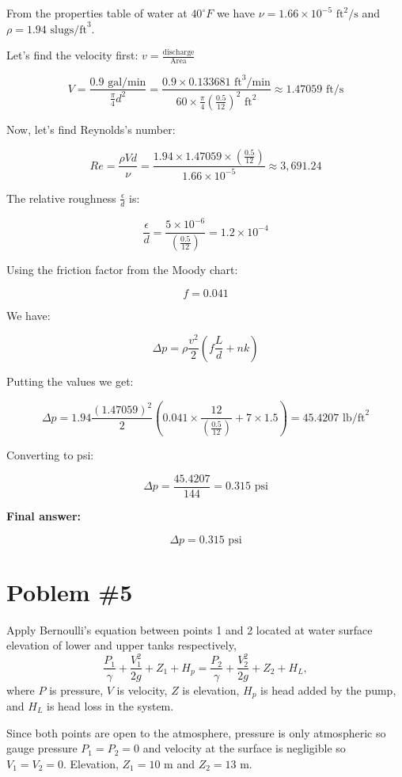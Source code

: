 \documentclass{article}
\begin{document}
From the properties table of water at $40^\circ F$ we have $\nu = 1.66 \times 10^{-5} \text{ ft}^2/\text{s}$ and $\rho = 1.94 \text{ slugs/ft}^3$.

Let's find the velocity first: $v = \frac{\text{discharge}}{\text{Area}}$

\[ V = \frac{0.9 \text{ gal/min}}{\frac{\pi}{4} d^2} = \frac{0.9 \times 0.133681 \text{ ft}^3/\text{min}}{60 \times \frac{\pi}{4} \left( \frac{0.5}{12} \right)^2 \text{ ft}^2} \approx 1.47059 \text{ ft/s} \]

Now, let's find Reynolds's number:

\[ Re = \frac{\rho V d}{\nu} = \frac{1.94 \times 1.47059 \times \left( \frac{0.5}{12} \right)}{1.66 \times 10^{-5}} \approx 3,691.24 \]

The relative roughness $\frac{\epsilon}{d}$ is:

\[ \frac{\epsilon}{d} = \frac{5 \times 10^{-6}}{\left( \frac{0.5}{12} \right)} = 1.2 \times 10^{-4} \]

Using the friction factor from the Moody chart:

\[ f = 0.041 \]

We have:

\[ \Delta p = \rho \frac{v^2}{2} \left( f \frac{L}{d} + nk \right) \]

Putting the values we get:

\[ \Delta p = 1.94 \frac{(1.47059)^2}{2} \left( 0.041 \times \frac{12}{\left( \frac{0.5}{12} \right)} + 7 \times 1.5 \right) = 45.4207 \text{ lb/ft}^2 \]

Converting to psi:

\[ \Delta p = \frac{45.4207}{144} = 0.315 \text{ psi} \]

\textbf{Final answer:}

\[ \Delta p = 0.315 \text{ psi} \]

\newpage
\section*{Poblem \#5}

Apply Bernoulli's equation between points 1 and 2 located at water surface elevation of lower and upper tanks respectively,
\[ \frac{P_1}{\gamma} + \frac{V_1^2}{2g} + Z_1 + H_p = \frac{P_2}{\gamma} + \frac{V_2^2}{2g} + Z_2 + H_L, \]
where $P$ is pressure, $V$ is velocity, $Z$ is elevation, $H_p$ is head added by the pump, and $H_L$ is head loss in the system.

Since both points are open to the atmosphere, pressure is only atmospheric so gauge pressure $P_1 = P_2 = 0$ and velocity at the surface is negligible so $V_1 = V_2 = 0$. Elevation, $Z_1 = 10$ m and $Z_2 = 13$ m.
\end{document}
